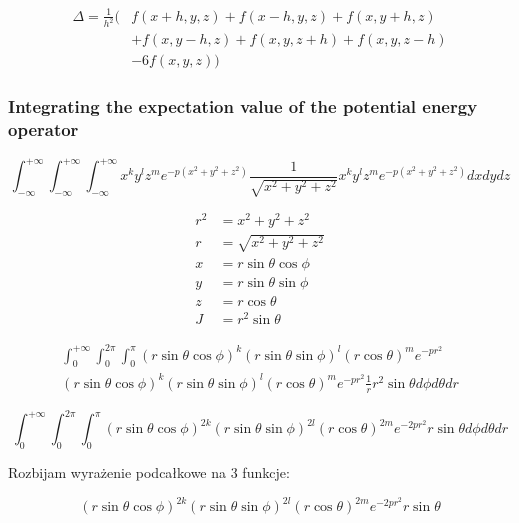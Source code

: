\begin{equation}
	\begin{aligned}
		\Delta = \frac{1}{h^2} \Big( 
		& f(x+h, y, z) + f(x-h, y, z) + f(x, y+h, z) \\
		& + f(x, y-h, z) + f(x, y, z+h) + f(x, y, z-h) \\
		& - 6f(x, y, z) 
		\Big)
	\end{aligned}
\end{equation}

\subsubsection{Integrating the expectation value of the potential energy operator}
\begin{equation}
	\int_{-\infty}^{+\infty} \int_{-\infty}^{+\infty} \int_{-\infty}^{+\infty} 
	x^k y^l z^m e^{-p (x^2+y^2+z^2)} \frac{1}{\sqrt{x^2+y^2+z^2}} x^k y^l z^m e^{-p(x^2+y^2+z^2)}
	dx dy dz
\end{equation}


\begin{align*} 
	r^2 &=  x^2+y^2+z^2 \\ 
	r &=  \sqrt{x^2+y^2+z^2} \\
	x &= r \sin{\theta} \cos{\phi} \\
	y &= r \sin{\theta} \sin{\phi} \\
	z &= r \cos{\theta} \\
	J &= r^2 \sin{\theta}
\end{align*}

\begin{multline}
	\int_{0}^{+\infty} \int_{0}^{2\pi} \int_{0}^{\pi} 
	(r \sin{\theta} \cos{\phi})^k
	(r \sin{\theta} \sin{\phi})^l
	(r \cos{\theta})^m 
	e^{-p r^2}
	\\
	(r \sin{\theta} \cos{\phi})^k
	(r \sin{\theta} \sin{\phi})^l
	(r \cos{\theta})^m
	e^{-p r^2} 
	\frac{1}{r}
	r^2 \sin{\theta}
	d\phi d\theta d r
\end{multline}

\begin{equation}
	\int_{0}^{+\infty} \int_{0}^{2\pi} \int_{0}^{\pi} 
	(r \sin{\theta} \cos{\phi})^{2k}
	(r \sin{\theta} \sin{\phi})^{2l}
	(r \cos{\theta})^{2m}
	e^{-2p r^2} 
	r \sin{\theta}
	d\phi d\theta d r
\end{equation}

Rozbijam wyrażenie podcałkowe na 3 funkcje:


\begin{equation}
	(r \sin{\theta} \cos{\phi})^{2k}
	(r \sin{\theta} \sin{\phi})^{2l}
	(r \cos{\theta})^{2m}
	e^{-2p r^2} 
	r \sin{\theta}
\end{equation}


